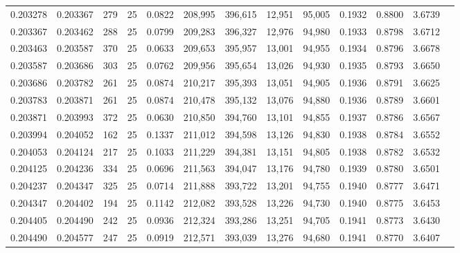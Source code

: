 \begin{tabular}{rrrrrrrrrrrrr}
0.203278 & 0.203367 &   279 &  25 &                                     0.0822 & 208,995 & 396,615 &  12,951 &  95,005 & 0.1932 & 0.8800 & 3.6739 \\
0.203367 & 0.203462 &   288 &  25 &                                     0.0799 & 209,283 & 396,327 &  12,976 &  94,980 & 0.1933 & 0.8798 & 3.6712 \\
0.203463 & 0.203587 &   370 &  25 &                                     0.0633 & 209,653 & 395,957 &  13,001 &  94,955 & 0.1934 & 0.8796 & 3.6678 \\
0.203587 & 0.203686 &   303 &  25 &                                     0.0762 & 209,956 & 395,654 &  13,026 &  94,930 & 0.1935 & 0.8793 & 3.6650 \\
0.203686 & 0.203782 &   261 &  25 &                                     0.0874 & 210,217 & 395,393 &  13,051 &  94,905 & 0.1936 & 0.8791 & 3.6625 \\
0.203783 & 0.203871 &   261 &  25 &                                     0.0874 & 210,478 & 395,132 &  13,076 &  94,880 & 0.1936 & 0.8789 & 3.6601 \\
0.203871 & 0.203993 &   372 &  25 &                                     0.0630 & 210,850 & 394,760 &  13,101 &  94,855 & 0.1937 & 0.8786 & 3.6567 \\
0.203994 & 0.204052 &   162 &  25 &                                     0.1337 & 211,012 & 394,598 &  13,126 &  94,830 & 0.1938 & 0.8784 & 3.6552 \\
0.204053 & 0.204124 &   217 &  25 &                                     0.1033 & 211,229 & 394,381 &  13,151 &  94,805 & 0.1938 & 0.8782 & 3.6532 \\
0.204125 & 0.204236 &   334 &  25 &                                     0.0696 & 211,563 & 394,047 &  13,176 &  94,780 & 0.1939 & 0.8780 & 3.6501 \\
0.204237 & 0.204347 &   325 &  25 &                                     0.0714 & 211,888 & 393,722 &  13,201 &  94,755 & 0.1940 & 0.8777 & 3.6471 \\
0.204347 & 0.204402 &   194 &  25 &                                     0.1142 & 212,082 & 393,528 &  13,226 &  94,730 & 0.1940 & 0.8775 & 3.6453 \\
0.204405 & 0.204490 &   242 &  25 &                                     0.0936 & 212,324 & 393,286 &  13,251 &  94,705 & 0.1941 & 0.8773 & 3.6430 \\
0.204490 & 0.204577 &   247 &  25 &                                     0.0919 & 212,571 & 393,039 &  13,276 &  94,680 & 0.1941 & 0.8770 & 3.6407 \\

\end{tabular}
